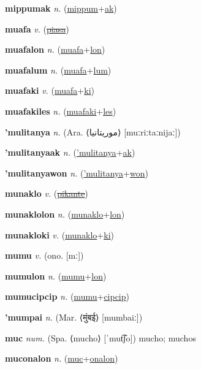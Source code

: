 \textbf{\hypertarget{mippumak}{mippumak}} \textit{n.} (\hyperlink{mippum}{mippum}+\allowbreak \hyperlink{ak}{ak})


\textbf{\hypertarget{muafa}{muafa}} \textit{v.} (\hyperlink{piasa}{\sout{piasa}})


\textbf{\hypertarget{muafalon}{muafalon}} \textit{n.} (\hyperlink{muafa}{muafa}+\allowbreak \hyperlink{lon}{lon})


\textbf{\hypertarget{muafalum}{muafalum}} \textit{n.} (\hyperlink{muafa}{muafa}+\allowbreak \hyperlink{lum}{lum})


\textbf{\hypertarget{muafaki}{muafaki}} \textit{v.} (\hyperlink{muafa}{muafa}+\allowbreak \hyperlink{ki}{ki})


\textbf{\hypertarget{muafakiles}{muafakiles}} \textit{n.} (\hyperlink{muafaki}{muafaki}+\allowbreak \hyperlink{les}{les})


\textbf{\hypertarget{'mulitanya}{'mulitanya}} \textit{n.} (Ara. ⟨{\arabics{}موريتانيا‎}⟩ [muːriːtaːnijaː])


\textbf{\hypertarget{'mulitanyaak}{'mulitanyaak}} \textit{n.} (\hyperlink{'mulitanya}{'mulitanya}+\allowbreak \hyperlink{ak}{ak})


\textbf{\hypertarget{'mulitanyawon}{'mulitanyawon}} \textit{n.} (\hyperlink{'mulitanya}{'mulitanya}+\allowbreak \hyperlink{won}{won})


\textbf{\hypertarget{munaklo}{munaklo}} \textit{v.} (\hyperlink{pikante}{\sout{pikante}})


\textbf{\hypertarget{munaklolon}{munaklolon}} \textit{n.} (\hyperlink{munaklo}{munaklo}+\allowbreak \hyperlink{lon}{lon})


\textbf{\hypertarget{munakloki}{munakloki}} \textit{v.} (\hyperlink{munaklo}{munaklo}+\allowbreak \hyperlink{ki}{ki})


\textbf{\hypertarget{mumu}{mumu}} \textit{v.} (ono. [mː])


\textbf{\hypertarget{mumulon}{mumulon}} \textit{n.} (\hyperlink{mumu}{mumu}+\allowbreak \hyperlink{lon}{lon})


\textbf{\hypertarget{mumucipcip}{mumucipcip}} \textit{n.} (\hyperlink{mumu}{mumu}+\allowbreak \hyperlink{cipcip}{cipcip})


\textbf{\hypertarget{'mumpai}{'mumpai}} \textit{n.} (Mar. ⟨{\devanagari{}मुंबई}⟩ [mumbaiː])


\textbf{\hypertarget{muc}{muc}} \textit{num.} (Spa. ⟨mucho⟩ [ˈmut͡ʃo])
mucho; muchos

\textbf{\hypertarget{muconalon}{muconalon}} \textit{n.} (\hyperlink{muc}{muc}+\allowbreak \hyperlink{onalon}{onalon})


